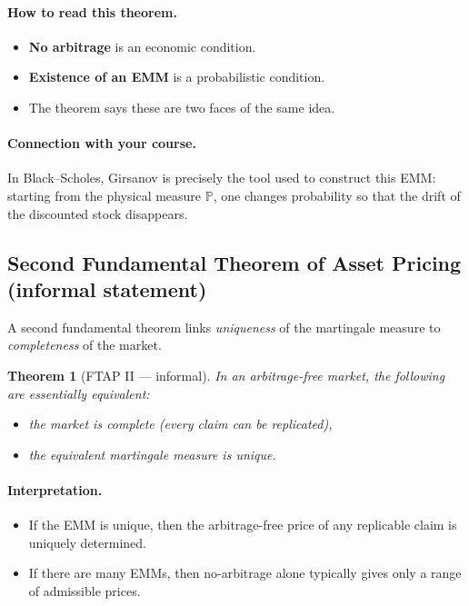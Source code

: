 \documentclass[11pt]{article}
\newcommand{\Pbb}{\mathbb{P}}
\newcommand{\1}{\mathbf{1}}
\newtheorem{theorem}{Theorem}
\begin{document}
\paragraph{How to read this theorem.}
\begin{itemize}[leftmargin=1.4em]
    \item \textbf{No arbitrage} is an economic condition.
    \item \textbf{Existence of an EMM} is a probabilistic condition.
    \item The theorem says these are two faces of the same idea.
\end{itemize}

\paragraph{Connection with your course.}
In Black--Scholes, Girsanov is precisely the tool used to construct this EMM:
starting from the physical measure \(\Pbb\), one changes probability so that the drift of the discounted stock disappears.

\subsection{Second Fundamental Theorem of Asset Pricing (informal statement)}

A second fundamental theorem links \emph{uniqueness} of the martingale measure to \emph{completeness} of the market.

\begin{theorem}[FTAP II --- informal]
In an arbitrage-free market, the following are essentially equivalent:
\begin{itemize}[leftmargin=1.4em]
    \item the market is complete (every claim can be replicated),
    \item the equivalent martingale measure is unique.
\end{itemize}
\end{theorem}

\paragraph{Interpretation.}
\begin{itemize}[leftmargin=1.4em]
    \item If the EMM is unique, then the arbitrage-free price of any replicable claim is uniquely determined.
    \item If there are many EMMs, then no-arbitrage alone typically gives only a range of admissible prices.
\end{itemize}
\end{document}
